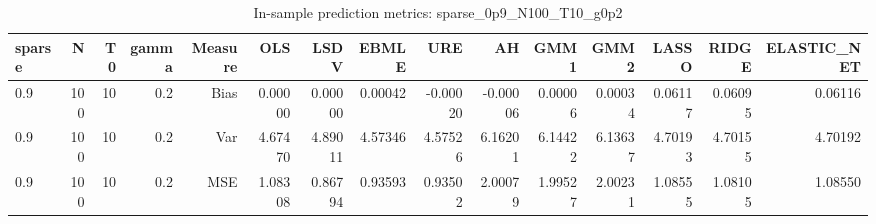 \begin{table}[!htbp]\centering
\caption{In-sample prediction metrics: sparse_0p9_N100_T10_g0p2}
\label{tab:table2_sparse_0p9_N100_T10_g0p2}
\begin{tabular}{lrrrrrrrrrrrrrr}
\hline
sparse & N & T0 & gamma & Measure & OLS & LSDV & EBMLE & URE & AH & GMM1 & GMM2 & LASSO & RIDGE & ELASTIC_NET \\
\hline
0.9 & 100 & 10 & 0.2 & Bias & 0.00000 & 0.00000 & 0.00042 & -0.00020 & -0.00006 & 0.00006 & 0.00034 & 0.06117 & 0.06095 & 0.06116 \\
0.9 & 100 & 10 & 0.2 & Var & 4.67470 & 4.89011 & 4.57346 & 4.57526 & 6.16201 & 6.14422 & 6.13637 & 4.70193 & 4.70155 & 4.70192 \\
0.9 & 100 & 10 & 0.2 & MSE & 1.08308 & 0.86794 & 0.93593 & 0.93502 & 2.00079 & 1.99527 & 2.00231 & 1.08555 & 1.08105 & 1.08550 \\
\hline
\end{tabular}
\end{table}

